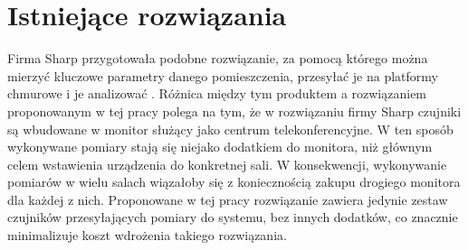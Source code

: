 \newpage
\section{Istniejące rozwiązania}
Firma Sharp przygotowała podobne rozwiązanie, za pomocą którego można mierzyć kluczowe 
parametry danego pomieszczenia, przesyłać je na platformy chmurowe i je analizować 
\cite{sharp2022}. Różnica między tym produktem a rozwiązaniem proponowanym w tej pracy 
polega na tym, że w rozwiązaniu firmy Sharp czujniki są wbudowane w monitor służący 
jako centrum telekonferencyjne. W ten sposób wykonywane pomiary stają się niejako 
dodatkiem do monitora, niż głównym celem wstawienia urządzenia do konkretnej sali. 
W konsekwencji, wykonywanie pomiarów w wielu salach wiązałoby się z koniecznością 
zakupu drogiego monitora dla każdej z nich. Proponowane w tej pracy rozwiązanie zawiera 
jedynie zestaw czujników przesyłających pomiary do systemu, bez innych dodatków, co 
znacznie minimalizuje koszt wdrożenia takiego rozwiązania.